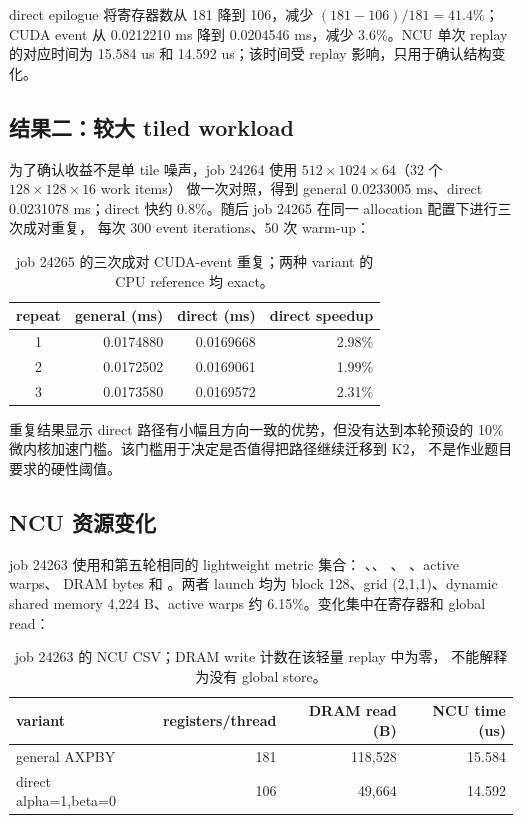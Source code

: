 direct epilogue 将寄存器数从 181 降到 106，减少
\((181-106)/181=41.4\%\)；CUDA event 从 0.0212210 ms 降到
0.0204546 ms，减少 3.6\%。NCU 单次 replay 的对应时间为 15.584 us
和 14.592 us；该时间受 replay 影响，只用于确认结构变化。

\subsection{结果二：较大 tiled workload}

为了确认收益不是单 tile 噪声，job 24264 使用
\(512\times1024\times64\)（32 个 \(128\times128\times16\) work items）
做一次对照，得到 general 0.0233005 ms、direct 0.0231078 ms；direct
快约 0.8\%。随后 job 24265 在同一 allocation 配置下进行三次成对重复，
每次 300 event iterations、50 次 warm-up：

\begin{table}[htbp]
\centering
\small
\begin{tabular}{c r r r}
\toprule
repeat & general (ms) & direct (ms) & direct speedup \\
\midrule
1 & 0.0174880 & 0.0169668 & 2.98\% \\
2 & 0.0172502 & 0.0169061 & 1.99\% \\
3 & 0.0173580 & 0.0169572 & 2.31\% \\
\bottomrule
\end{tabular}
\caption{job 24265 的三次成对 CUDA-event 重复；两种 variant 的
CPU reference 均 exact。}
\end{table}

重复结果显示 direct 路径有小幅且方向一致的优势，但没有达到本轮预设的
10\% 微内核加速门槛。该门槛用于决定是否值得把路径继续迁移到 K2，
不是作业题目要求的硬性阈值。

\subsection{NCU 资源变化}

job 24263 使用和第五轮相同的 lightweight metric 集合：
、、
、
、active warps、
DRAM bytes 和 。两者 launch 均为 block
128、grid (2,1,1)、dynamic shared memory 4,224 B、active warps
约 6.15\%。变化集中在寄存器和 global read：

\begin{table}[htbp]
\centering
\small
\begin{tabular}{l r r r}
\toprule
variant & registers/thread & DRAM read (B) & NCU time (us) \\
\midrule
general AXPBY & 181 & 118,528 & 15.584 \\
direct alpha=1,beta=0 & 106 & 49,664 & 14.592 \\
\bottomrule
\end{tabular}
\caption{job 24263 的 NCU CSV；DRAM write 计数在该轻量 replay 中为零，
不能解释为没有 global store。}
\end{table}


